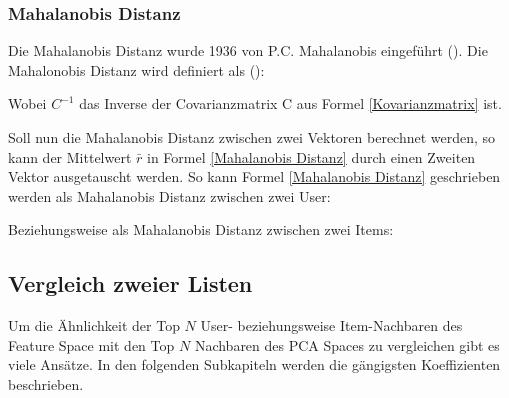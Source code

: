 


\subsubsection{Mahalanobis Distanz}
Die Mahalanobis Distanz wurde 1936 von P.C. Mahalanobis eingeführt (\cite{mahalanobis1936generalized}).
Die Mahalonobis Distanz wird definiert als (\cite{DEMAESSCHALCK20001}):

Wobei $C^{-1}$ das Inverse der Covarianzmatrix C aus Formel  \ref{Kovarianzmatrix} ist.

Soll nun die Mahalanobis Distanz zwischen zwei Vektoren berechnet werden, so kann der Mittelwert $\bar{r}$ in Formel \ref{Mahalanobis Distanz} durch einen Zweiten Vektor ausgetauscht werden. So kann Formel \ref{Mahalanobis Distanz} geschrieben werden als Mahalanobis Distanz zwischen zwei User:


Beziehungsweise als Mahalanobis Distanz zwischen zwei Items:



\subsection{Vergleich zweier Listen}
Um die Ähnlichkeit der Top $N$ User- beziehungsweise Item-Nachbaren des Feature Space mit den Top $N$ Nachbaren des PCA Spaces zu vergleichen gibt es viele Ansätze. In den folgenden Subkapiteln werden die gängigsten Koeffizienten beschrieben. 
